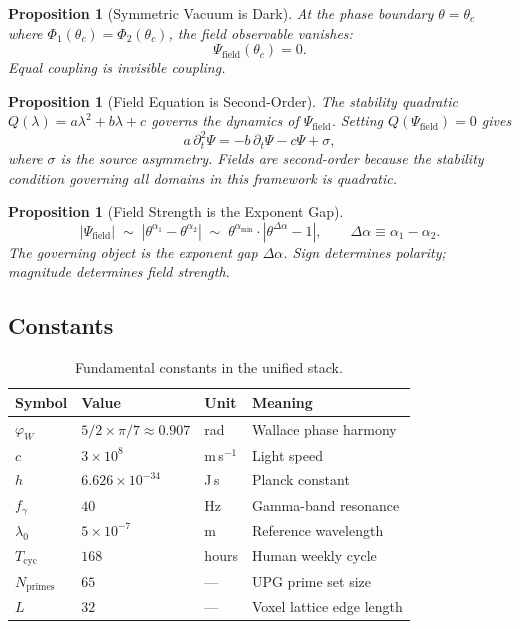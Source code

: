 \documentclass[11pt,twoside]{article}
\theoremstyle{plain}
\newtheorem{proposition}[theorem]{Proposition}
\theoremstyle{definition}
\theoremstyle{remark}
\begin{document}
\begin{proposition}[Symmetric Vacuum is Dark]\label{prop:vacuum}
At the phase boundary $\theta=\theta_c$ where $\Phi_1(\theta_c)=\Phi_2(\theta_c)$,
the field observable vanishes:
\begin{equation}
  \varPsi_{\mathrm{field}}(\theta_c) = 0.
\end{equation}
Equal coupling is invisible coupling.
\end{proposition}

\begin{proposition}[Field Equation is Second-Order]\label{prop:second-order}
The stability quadratic $Q(\lambda)=a\lambda^2+b\lambda+c$ governs the dynamics
of $\varPsi_{\mathrm{field}}$.  Setting $Q(\varPsi_{\mathrm{field}})=0$ gives
\begin{equation}\label{eq:field-eq}
  a\,\partial_t^2\varPsi = -b\,\partial_t\varPsi - c\varPsi + \sigma,
\end{equation}
where $\sigma$ is the source asymmetry.  Fields are second-order because the
stability condition governing all domains in this framework is quadratic.
\end{proposition}

\begin{proposition}[Field Strength is the Exponent Gap]
\begin{equation}
  |\varPsi_{\mathrm{field}}| \;\sim\; |\theta^{\alpha_1} - \theta^{\alpha_2}|
  \;\sim\; \theta^{\alpha_{\min}}\cdot|\theta^{\Delta\alpha}-1|,
  \qquad \Delta\alpha \equiv \alpha_1 - \alpha_2.
\end{equation}
The governing object is the exponent gap $\Delta\alpha$.  Sign determines
polarity; magnitude determines field strength.
\end{proposition}

\subsection{Constants}

\begin{table}[h!]
\centering\small
\caption{Fundamental constants in the unified stack.}
\begin{tabular}{llll}
\toprule
Symbol & Value & Unit & Meaning \\
\midrule
$\varphi_W$ & $5/2 \times\pi/7 \approx 0.907$ & rad & Wallace phase harmony \\
$c$ & $3\times10^8$ & m\,s$^{-1}$ & Light speed \\
$h$ & $6.626\times10^{-34}$ & J\,s & Planck constant \\
$f_\gamma$ & $40$ & Hz & Gamma-band resonance \\
$\lambda_0$ & $5\times10^{-7}$ & m & Reference wavelength \\
$T_{\mathrm{cyc}}$ & $168$ & hours & Human weekly cycle \\
$N_{\mathrm{primes}}$ & $65$ & --- & UPG prime set size \\
$L$ & $32$ & --- & Voxel lattice edge length \\
\bottomrule
\end{tabular}
\end{table}
\end{document}
